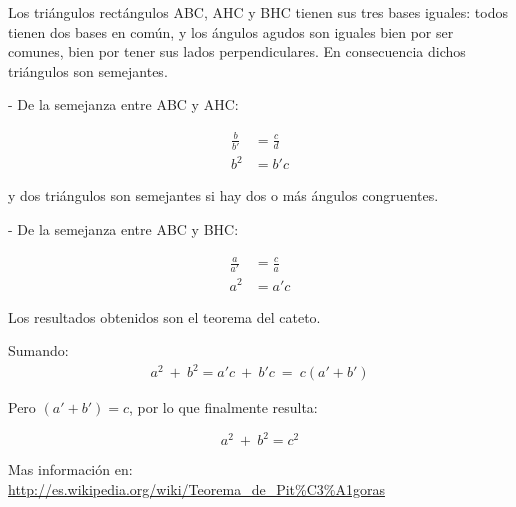 \documentclass[12pt,letterpaper,twocolumn]{article}
\begin{document}
Los triángulos rectángulos ABC, AHC y BHC tienen sus tres bases iguales: todos tienen dos bases en común, y los ángulos agudos son iguales bien por ser comunes, bien por tener sus lados perpendiculares. En consecuencia dichos triángulos son semejantes.

- De la semejanza entre ABC y AHC:

\begin{align*}
	    \frac{b}{b'}  & = \frac{c}{d} \\
	    b^{2} & =  b'c
\end{align*}
    
    y dos triángulos son semejantes si hay dos o más ángulos congruentes.

- De la semejanza entre ABC y BHC:

\begin{align*}
   \frac{a}{ a'} & = \frac{c}{a}\\
   a^{2} & = a'c
\end{align*}

Los resultados obtenidos son el teorema del cateto.

Sumando:
\begin{align*}
     a^2 \  + \  b^2 = a'c \ + \ b'c \  = \  c(a'+b')
\end{align*}

Pero $(a'+ b')= c$, por lo que finalmente resulta:

\[
    a^2 \ +  \ b^2 =c^2
\]
  
Mas información en: \url{http://es.wikipedia.org/wiki/Teorema_de_Pit\%C3\%A1goras}
\end{document}
